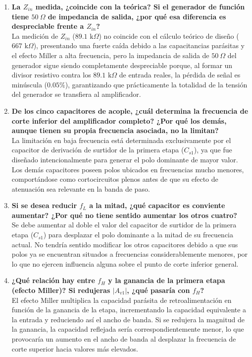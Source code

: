 \begin{enumerate}
\item \textbf{La $Z_{in}$ medida, ¿coincide con la teórica? Si el generador de función tiene $50~\Omega$ de impedancia de salida, ¿por qué esa diferencia es despreciable frente a $Z_{in}$?} \\
La medición de $Z_{in}$ ($89.1\text{ k}\Omega$) no coincide con el cálculo teórico de diseño ($667\text{ k}\Omega$), presentando una fuerte caída debido a las capacitancias parásitas y el efecto Miller a alta frecuencia, pero la impedancia de salida de $50\ \Omega$ del generador sigue siendo completamente despreciable porque, al formar un divisor resistivo contra los $89.1\text{ k}\Omega$ de entrada reales, la pérdida de señal es minúscula ($0.05\%$), garantizando que prácticamente la totalidad de la tensión del generador se transfiera al amplificador. 

\item \textbf{De los cinco capacitores de acople, ¿cuál determina la frecuencia de corte inferior del amplificador completo? ¿Por qué los demás, aunque tienen su propia frecuencia asociada, no la limitan?} \\
La limitación en baja frecuencia está determinada exclusivamente por el capacitor de derivación de surtidor de la primera etapa ($C_{s1}$), ya que fue diseñado intencionalmente para generar el polo dominante de mayor valor. Los demás capacitores poseen polos ubicados en frecuencias mucho menores, comportándose como cortocircuitos plenos antes de que su efecto de atenuación sea relevante en la banda de paso.

\item \textbf{Si se desea reducir $f_L$ a la mitad, ¿qué capacitor es conviente aumentar? ¿Por qué no tiene sentido aumentar los otros cuatro?} \\
Se debe aumentar al doble el valor del capacitor de surtidor de la primera etapa ($C_{s1}$) para desplazar el polo dominante a la mitad de su frecuencia actual. No tendría sentido modificar los otros capacitores debido a que sus polos ya se encuentran situados a frecuencias considerablemente menores, por lo que no ejercen influencia alguna sobre el punto de corte inferior general.

\item \textbf{¿Qué relación hay entre $f_H$ y la ganancia de la primera etapa (efecto Miller)? Si redujeras $|A_{v1}|$, ¿qué pasaría con $f_H$?} \\
El efecto Miller multiplica la capacidad parásita de retroalimentación en función de la ganancia de la etapa, incrementando la capacidad equivalente a la entrada y reduciendo así el ancho de banda. Si se redujera la magnitud de la ganancia, la capacidad reflejada sería correspondientemente menor, lo que provocaría un aumento en el ancho de banda al desplazar la frecuencia de corte superior hacia valores más elevados.


\end{enumerate}
